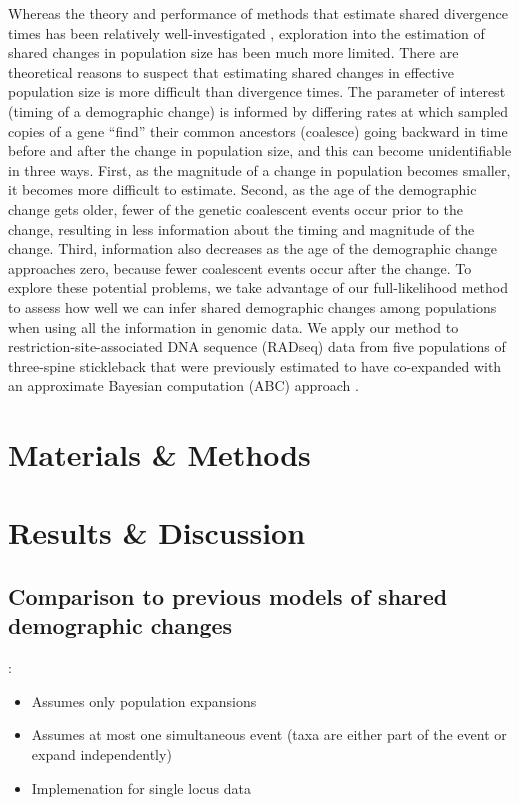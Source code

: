 Whereas the theory and performance of methods that estimate shared divergence
times has been relatively well-investigated
\citep[e.g.,][]{Oaks2012,Hickerson2013,Oaks2014reply,Oaks2014dpp,Overcast2017,Oaks2018ecoevolity},
exploration into the estimation of shared changes in population size has been
much more limited.
There are theoretical reasons to suspect that estimating shared changes in
effective population size is more difficult than divergence times.
The parameter of interest (timing of a demographic change) is informed by
differing rates at which sampled copies of a gene ``find'' their common
ancestors (coalesce) going backward in time before and after the change in
population size, and this can become unidentifiable in three ways.
First, as the magnitude of a change in population becomes smaller,
it becomes more difficult to estimate.
Second, as the age of the demographic change gets older, fewer of the genetic
coalescent events occur prior to the change, resulting in less information
about the timing and magnitude of the change.
Third, information also decreases as the age of the demographic change
approaches zero, because fewer coalescent events occur after the change.
To explore these potential problems, we take advantage of our full-likelihood
method to assess how well we can infer shared demographic changes among
populations when using all the information in genomic data.
We apply our method to restriction-site-associated DNA sequence (RADseq) data
from five populations of three-spine stickleback
\citep[;][]{Hohenlohe2010}
that were previously estimated to have co-expanded with an approximate Bayesian
computation (ABC) approach \citep{Xue2015}.

\ifembed{

}{}



\section{Materials \& Methods}




\section{Results \& Discussion}



\subsection{Comparison to previous models of shared demographic changes}
\citet{Chan2014}:
\begin{itemize}
    \item Assumes only population expansions
    \item Assumes at most one simultaneous event (taxa are either part of the
        event or expand independently)
    \item Implemenation for single locus data
\end{itemize}

